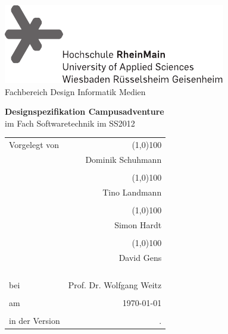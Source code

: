 \begin{titlepage}
	\begin{center}
		\includegraphics{meta/hsrm-logo} \\[0.7cm]
		{Fachbereich Design Informatik Medien}
		
		\vfill

		{\huge \bfseries Designspezifikation Campusadventure}\\[0.1cm]
                im Fach Softwaretechnik im SS2012
		
		\vfill
		\begin{tabular}{lr}
			Vorgelegt von & \line(1,0){100} \\
						  & Dominik Schuhmann \\ 
						  & \\
						  & \line(1,0){100} \\
                          & Tino Landmann \\ 
						  & \\
						  & \line(1,0){100} \\
                          & Simon Hardt \\
						  & \\
						  & \line(1,0){100} \\
                          & David Gens \\
                        \\
						\\
                        \\
						\\
			bei           & Prof. Dr. Wolfgang Weitz \\
                        \\
						am			  & \today \\
						\\
                        in der Version       &	\svnrev. \\
		\end{tabular}
		\vfill
		
		
	\end{center}
\end{titlepage}
